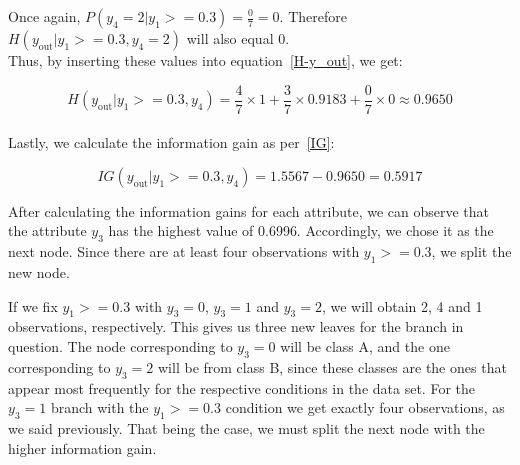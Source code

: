 \documentclass[12pt]{article}
\begin{document}
\begin{enumerate}[leftmargin=\labelsep]
\newpage

\begin{flushleft}
    Once again,  $P(y_4 = 2 | y_1 >= 0.3) = \frac{0}{7} = 0$. Therefore $H(y_{\text{out}} | y_1 >= 0.3, y_4 = 2)$ will also equal 0.\\
    \vspace{1em}
    Thus, by inserting these values into equation~\eqref{H-y_out}, we get:
\end{flushleft}

\begin{equation*}
    H(y_{\text{out}}|y_1 >= 0.3, y_4) = \frac{4}{7} \times 1 + \frac{3}{7} \times 0.9183 + \frac{0}{7} \times 0 \approx 0.9650
\end{equation*}
\\
Lastly, we calculate the information gain as per~\eqref{IG}:

\begin{equation*}
    IG(y_{\text{out}} | y_1 >= 0.3, y_4) = 1.5567 - 0.9650 = 0.5917
\end{equation*}

\vspace{0.5cm}

\hspace*{2em}After calculating the information gains for each attribute, we can observe that the attribute $y_3$ has the highest value of 0.6996. 
Accordingly, we chose it as the next node. Since there are at least four observations with $y_1 >= 0.3$, we split the new node. 

\hspace*{2em}If we fix $y_1 >= 0.3$ with $y_3 = 0$, $y_3 = 1$ and $y_3 = 2$, we will obtain 2, 4 and 1 observations, respectively. This gives us three new leaves for the branch in question. The node corresponding to $y_3 = 0$ will be class A, and the one corresponding to $y_3 = 2$ will be from class B, since these classes are the ones that appear most frequently for the respective conditions in the data set.
For the $y_3 = 1$ branch with the $y_1 >= 0.3$  condition we get exactly four observations, as we said previously. That being the case, we must split the next node with the higher information gain. 


\end{enumerate}
\end{document}

